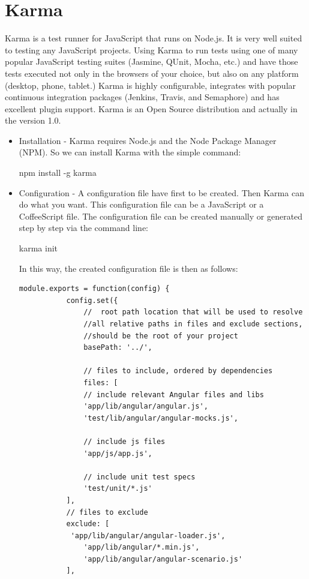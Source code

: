 \documentclass[11pt]{article}
\begin{document}
\section{Karma}

Karma is a test runner for JavaScript that runs on Node.js. It is very well suited to testing any JavaScript projects. Using Karma to run tests using one of many popular JavaScript testing suites (Jasmine, QUnit, Mocha, etc.) and have those tests executed not only in the browsers of your choice, but also on any platform (desktop, phone, tablet.) Karma is highly configurable, integrates with popular continuous integration packages (Jenkins, Travis, and Semaphore) and has excellent plugin support. Karma is an Open Source distribution and actually in the version 1.0.

\begin{itemize}
\item Installation - Karma requires Node.js and the Node Package Manager (NPM). So we can install Karma with the simple command:

\textdollar{} npm install -g karma
\item Configuration - A configuration file have first to be created. Then Karma can do what you want. This configuration file can be a JavaScript or a CoffeeScript file. The configuration file can be created manually or generated step by step via the command line:

\textdollar{} karma init

In this way, the created configuration file is then as follows:
\pagebreak
\begin{lstlisting}[caption=Karma configuration file ]
       module.exports = function(config) {  
           config.set({  
               //  root path location that will be used to resolve  
               //all relative paths in files and exclude sections,  
               //should be the root of your project  
               basePath: '../',  
         
               // files to include, ordered by dependencies  
               files: [  
               // include relevant Angular files and libs  
               'app/lib/angular/angular.js',  
               'test/lib/angular/angular-mocks.js',  
     
               // include js files  
               'app/js/app.js',  
     
               // include unit test specs  
               'test/unit/*.js'  
           ],  
           // files to exclude  
           exclude: [  
            'app/lib/angular/angular-loader.js',  
               'app/lib/angular/*.min.js',  
               'app/lib/angular/angular-scenario.js'  
           ],  
     

\end{lstlisting}
\end{itemize}
\end{document}
